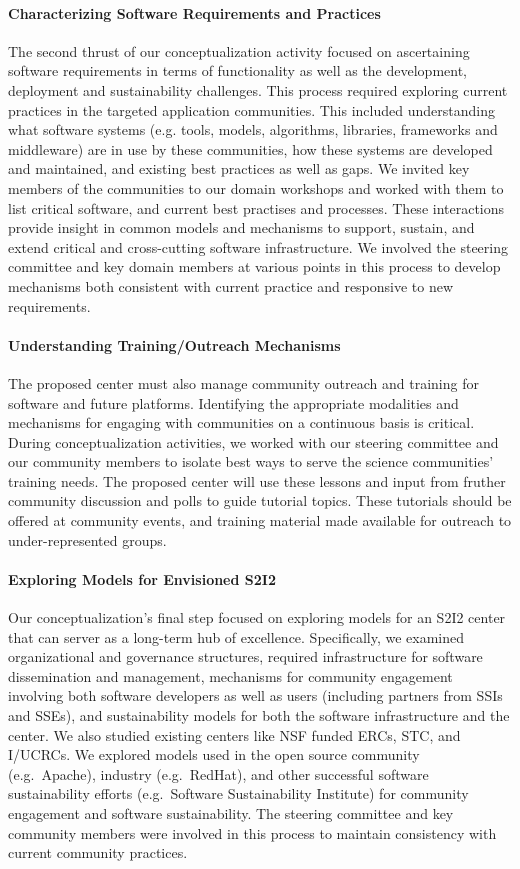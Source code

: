 \paragraph{Characterizing Software Requirements and Practices} 
The second thrust of our conceptualization
activity focused on ascertaining software requirements in terms of functionality as well as the
development, deployment and sustainability challenges. 
This process required exploring current
practices in the targeted application communities. 
This included understanding what software
systems (e.g. tools, models, algorithms, libraries, frameworks and middleware) 
are in use by these communities, 
how these systems are developed and maintained, and existing best practices as well
as gaps. 
We invited key members of the communities to our domain workshops
and worked with them to list critical software, and current best practises and processes. 
These interactions provide insight in common models and mechanisms 
to support, sustain, and extend critical and cross-cutting software infrastructure. 
We involved the steering committee and key domain members at various points in this process 
to develop mechanisms both consistent with current practice and responsive to new requirements.

\paragraph{Understanding Training/Outreach Mechanisms} 
The proposed center must also manage community
outreach and training for software and future platforms. 
Identifying the appropriate modalities
and mechanisms for engaging with communities on a continuous basis is critical. 
During conceptualization activities, we worked with our steering committee 
and our community members to isolate best ways to serve the science communities' training needs. 
The proposed center will use these lessons and input from fruther community discussion and polls to guide tutorial topics. 
These tutorials should be offered at
community events, and training material made available for outreach to under-represented groups.

\paragraph{Exploring Models for Envisioned S2I2} 
Our conceptualization's final step focused on exploring
models for an S2I2 center that can server as a long-term hub of excellence. 
Specifically, we examined organizational and governance structures, 
required infrastructure for software dissemination and management, 
mechanisms for community engagement involving both software developers
as well as users (including partners from SSIs and SSEs), 
and sustainability models for both the software infrastructure and the center. 
We also studied existing centers like NSF funded ERCs, STC, and I/UCRCs.
We explored models used in the open source community
(e.g.\ Apache), industry (e.g.\ RedHat), and other successful software sustainability efforts (e.g.\ Software Sustainability Institute) for community engagement and software sustainability.
The steering committee and key community members were involved in this process to
maintain consistency with current community practices.

